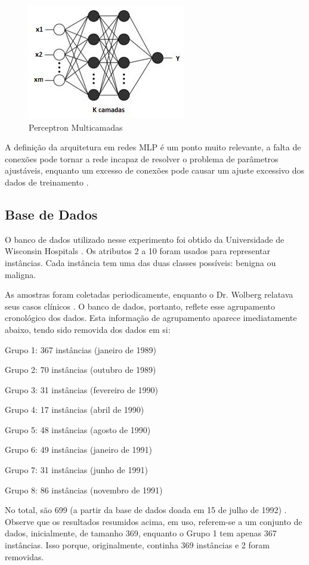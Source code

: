 \documentclass[conference]{IEEEtran}
\begin{document}
    \begin{figure}[htbp]
	\centerline{\includegraphics[scale=1.2]{Perceptron-Multicamadas.png}}
	\caption{Perceptron Multicamadas}
	\label{fig}
	\end{figure}
    
    A definição da arquitetura em redes MLP é um ponto muito relevante, a falta de conexões pode tornar a rede incapaz de resolver o problema de parâmetros ajustáveis, enquanto um excesso de conexões pode causar um ajuste excessivo dos dados de treinamento \cite{b7}.

    \subsection{Base de Dados}

    O banco de dados utilizado nesse experimento foi obtido da Universidade de Wisconsin Hospitals \cite{b10} \cite{b11}. Os atributos 2 a 10 foram usados para representar instâncias. Cada instância tem uma das duas classes possíveis: benigna ou maligna.
    
    As amostras foram coletadas periodicamente, enquanto o Dr. Wolberg relatava seus casos clínicos \cite{b12}. 
    O banco de dados, portanto, reflete esse agrupamento cronológico dos dados.
    Esta informação de agrupamento aparece imediatamente abaixo, tendo sido removida    dos dados em si:

\begin{description}
     \item Grupo 1: 367 instâncias (janeiro de 1989)
     \item Grupo 2: 70 instâncias (outubro de 1989)
     \item Grupo 3: 31 instâncias (fevereiro de 1990)
     \item Grupo 4: 17 instâncias (abril de 1990)
     \item Grupo 5: 48 instâncias (agosto de 1990)
     \item Grupo 6: 49 instâncias (janeiro de 1991)
     \item Grupo 7: 31 instâncias (junho de 1991)
     \item Grupo 8: 86 instâncias (novembro de 1991)
\end{description}
    No total, são 699 (a partir da base de dados doada em 15 de julho de 1992) \cite{b10} \cite{b11}. Observe que os resultados resumidos acima, em uso, referem-se a um conjunto de dados, inicialmente,   de tamanho 369, enquanto o Grupo 1 tem apenas 367 instâncias. Isso porque, originalmente, continha 369 instâncias e 2 foram removidas. 
   
\end{document}
